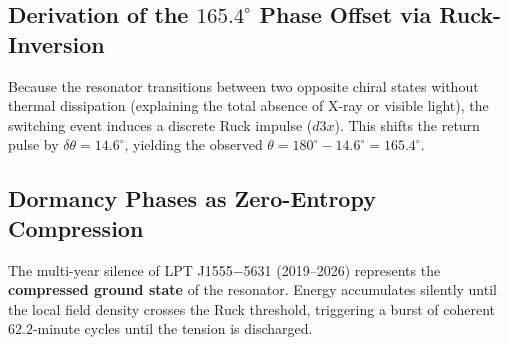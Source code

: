 \documentclass[11pt,a4paper,oneside]{article}
\def\dddot#1{d3#1}%
\def\texttt#1{#1}%
\theoremstyle{definition}
\begin{document}
\subsection{Derivation of the $165.4^\circ$ Phase Offset via Ruck-Inversion}
Because the resonator transitions between two opposite chiral states without thermal dissipation (explaining the total absence of X-ray or visible light), the switching event induces a discrete Ruck impulse ($\dddot{x}$). This shifts the return pulse by $\delta \theta = 14.6^\circ$, yielding the observed $\theta = 180^\circ - 14.6^\circ = 165.4^\circ$.
\subsection{Dormancy Phases as Zero-Entropy Compression}
The multi-year silence of \texttt{LPT J1555$-$5631} (2019–2026) represents the \textbf{compressed ground state} of the resonator. Energy accumulates silently until the local field density crosses the Ruck threshold, triggering a burst of coherent $62.2$-minute cycles until the tension is discharged.
\end{document}
